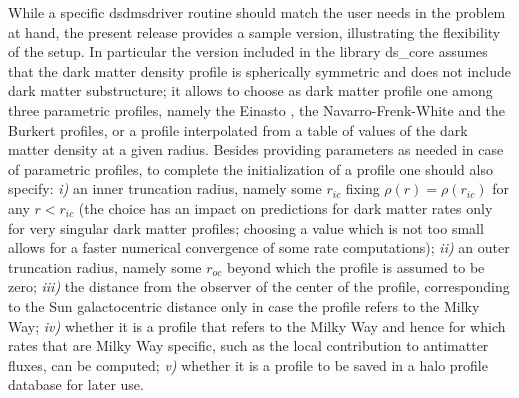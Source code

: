 \documentclass[a4paper,10pt,oneside]{book}
\newcommand{\code}[1]{\ft{#1}}
\newcommand{\ft}[1]{\textsf{#1}}
\begin{document}
While a specific \code{dsdmsdriver} routine should match the user needs in the problem at hand, the present release provides
a sample version, illustrating the flexibility of the setup. In particular the version included in the library \code{ds\_core} assumes that the dark
matter density profile is spherically symmetric and does not include dark matter substructure; it allows to choose as dark matter 
profile one among three parametric profiles, namely the Einasto \cite{1965TrAlm...5...87E}, the Navarro-Frenk-White \cite{Navarro:1995iw}
and the Burkert \cite{XXX} profiles, or a profile interpolated from a table of values of the dark matter density at a given radius. 
Besides providing parameters as needed in case of parametric profiles, to complete the initialization of a profile one should also specify: 
{\sl i)} an inner truncation radius, namely some $r_{ic}$ fixing $\rho(r)=\rho(r_{ic})$ for any $r<r_{ic}$ (the choice has an impact on predictions
for dark matter rates only for very singular dark matter profiles; choosing a value which is not too small allows for a faster numerical 
convergence of some rate computations); {\sl ii)} an outer truncation radius, namely some $r_{oc}$ beyond which the profile is assumed to 
be zero; {\sl iii)} the distance from the observer of the center of the profile, corresponding to the Sun galactocentric distance only in case 
the profile refers to the Milky Way; {\sl iv)} whether it is a profile that refers to the Milky Way and hence for which rates that are Milky Way 
specific, such as the local contribution to antimatter fluxes, can be computed;  {\sl v)} whether it is a profile to be saved in a halo profile
database for later use. 
\end{document}
